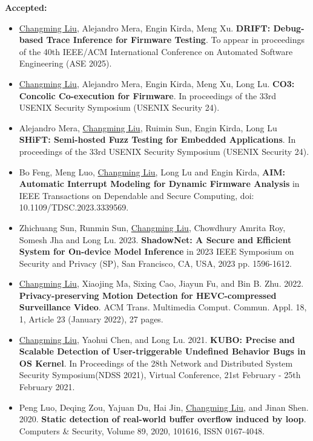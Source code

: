\documentclass[letterpaper,onecolumn,10pt]{article}
\begin{document}
\textbf{Accepted:}
\begin{itemize}
	\item \underline{Changming Liu}, Alejandro Mera, Engin Kirda, Meng Xu.   {\bf DRIFT: Debug-based Trace Inference for Firmware Testing}. To appear in proceedings of the 40th IEEE/ACM International Conference on Automated Software Engineering (ASE 2025). 

	\item \underline{Changming Liu}, Alejandro Mera, Engin Kirda, Meng Xu, Long Lu.  {\bf CO3: Concolic Co-execution for Firmware}. In proceedings of the 33rd USENIX Security Symposium (USENIX Security 24). 
	
	\item Alejandro Mera, \underline{Changming Liu}, Ruimin Sun, Engin Kirda, Long Lu  {\bf SHiFT: Semi-hosted Fuzz Testing for Embedded Applications}. In proceedings of the 33rd USENIX Security Symposium (USENIX Security 24). 

	\item Bo Feng, Meng Luo, \underline{Changming Liu}, Long Lu and Engin Kirda, {\bf AIM: Automatic Interrupt Modeling for Dynamic Firmware Analysis} in IEEE Transactions on Dependable and Secure Computing, doi: 10.1109/TDSC.2023.3339569.

	\item Zhichuang Sun, Runmin Sun, \underline{Changming Liu}, Chowdhury Amrita Roy, Somesh Jha and Long Lu. 2023. {\bf ShadowNet: A Secure and Efficient System for On-device Model Inference} in 2023 IEEE Symposium on Security and Privacy (SP), San Francisco, CA, USA, 2023 pp. 1596-1612.

	\item \underline{Changming Liu}, Xiaojing Ma, Sixing Cao, Jiayun Fu, and Bin B. Zhu. 2022. {\bf Privacy-preserving Motion Detection for HEVC-compressed Surveillance Video}. 
	ACM Trans. Multimedia Comput. Commun. Appl. 18, 1, Article 23 (January 2022), 27 pages.

	\item \underline{Changming Liu}, Yaohui Chen, and Long Lu. 2021. {\bf KUBO: Precise and Scalable Detection of User-triggerable Undefined Behavior Bugs in OS Kernel}. 
	In Proceedings of the 28th Network and Distributed System Security Symposium(NDSS 2021), Virtual Conference, 21st February - 25th February 2021.

	\item Peng Luo, Deqing Zou, Yajuan Du, Hai Jin, \underline{Changming Liu}, and Jinan Shen. 2020. {\bf Static detection of real-world buffer overflow induced by loop}. Computers \& Security, Volume 89, 2020, 101616, ISSN 0167-4048.


\end{itemize}
\end{document}
